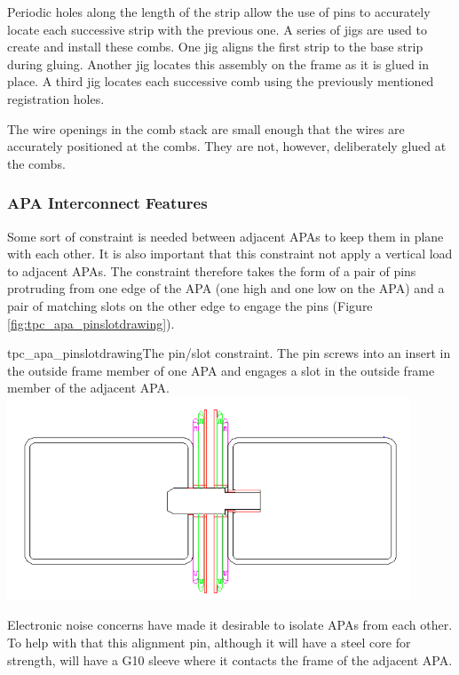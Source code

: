 Periodic holes along the length of the strip allow the use of pins to accurately locate each successive strip with the previous one.  A series of jigs are used to create and install these combs.  One jig aligns the first strip to the base strip during gluing.  Another jig locates this assembly on the frame as it is glued in place. A third jig locates each successive comb using the previously mentioned registration holes.

The wire openings in the comb stack are small enough that the wires are accurately positioned at the combs.  They are not, however, deliberately glued at the combs.  

\subsubsection{APA Interconnect Features}

Some sort of constraint is needed between adjacent APAs to keep them in plane with each other.  It is also important that this constraint not apply a vertical load to adjacent APAs.  The constraint therefore takes the form of a pair of pins protruding from one edge of the APA (one high and one low on the APA) and a pair of matching slots on the other edge to engage the pins (Figure \ref{fig:tpc_apa_pinslotdrawing}).

\begin{cdrfigure}{tpc_apa_pinslotdrawing}{The pin/slot constraint.  The pin screws into an insert in the outside frame member of one APA and engages a slot in the outside frame member of the adjacent APA.}
\includegraphics[width=0.9\textwidth]{figures/tpc_apa_pinslotdrawing.png} 
\end{cdrfigure}

Electronic noise concerns have made it desirable to isolate APAs from each other.  To help with that this alignment pin, although it will have a steel core for strength, will have a G10 sleeve where it contacts the frame of the adjacent APA.



